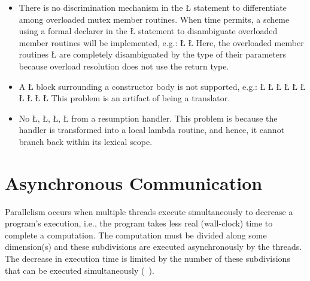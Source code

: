 \documentclass[openright,twoside]{report}
\begin{document}
\begin{itemize}
\item
There is no discrimination mechanism in the \LGinlinetrue\LGbegin\lgrinde\L{}\endlgrinde\LGend{} statement to differentiate among overloaded mutex member routines.
When time permits, a scheme using a formal declarer in the \LGinlinetrue\LGbegin\lgrinde\L{}\endlgrinde\LGend{} statement to disambiguate overloaded member routines will be implemented, e.g.:
\LGinlinefalse\LGbegin\lgrinde
\L{}
\L{}
\endlgrinde\LGend
Here, the overloaded member routines \LGinlinetrue\LGbegin\lgrinde\L{}\endlgrinde\LGend{} are completely disambiguated by the type of their parameters because \CC overload resolution does not use the return type.

\item
A \LGinlinetrue\LGbegin\lgrinde\L{}\endlgrinde\LGend{} block surrounding a constructor body is not supported, e.g.:
\LGinlinefalse\LGbegin\lgrinde
\L{}
\L{\LB{}}
\L{}
\L{\LB{}}
\CE{}\L{\LB{\};}}
\L{}
\L{\LB{}}
\CE{}\L{}
\L{\LB{}}
\CE{}\L{\LB{\}}}
\endlgrinde\LGend
This problem is an artifact of \uC being a translator.
\item
No \LGinlinetrue\LGbegin\lgrinde\L{}\endlgrinde\LGend{}, \LGinlinetrue\LGbegin\lgrinde\L{}\endlgrinde\LGend{}, \LGinlinetrue\LGbegin\lgrinde\L{}\endlgrinde\LGend{}, \LGinlinetrue\LGbegin\lgrinde\L{}\endlgrinde\LGend{} from a resumption handler.
This problem is because the handler is transformed into a local lambda routine, and hence, it cannot branch back within its lexical scope.
\end{itemize}


\chapter{Asynchronous Communication}
\label{s:AsynchronousCommunication}

Parallelism occurs when multiple threads execute simultaneously to decrease a program's execution, i.e., the program takes less real (wall-clock) time to complete a computation.
The computation must be divided along some dimension(s) and these subdivisions are executed asynchronously by the threads.
The decrease in execution time is limited by the number of these subdivisions that can be executed simultaneously (~\cite{Amdahl67}).
\end{document}
